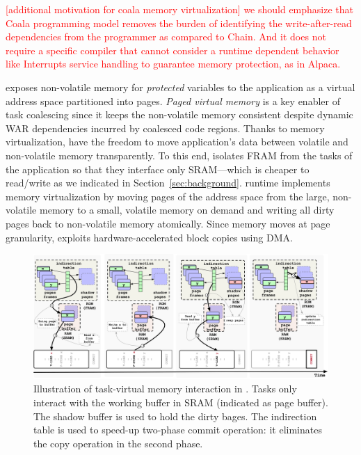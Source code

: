 \textcolor{red}{[additional motivation for coala memory virtualization] we should emphasize that Coala programming model removes the burden of identifying the write-after-read dependencies from the programmer  as compared to Chain. And it does not require a specific compiler that cannot consider a runtime dependent behavior like Interrupts service handling to guarantee memory protection, as in Alpaca.}

\sys exposes non-volatile memory for \emph{protected} variables to
the application as a virtual address space partitioned into pages.
\emph{Paged virtual memory} is a key enabler of task coalescing since it keeps the non-volatile memory consistent despite dynamic WAR dependencies incurred by coalesced code regions. Thanks to memory virtualization, \sys have the freedom to move application's data between volatile and non-volatile memory transparently.
%
%
To this end, \sys isolates FRAM from the tasks of the application so that they interface only SRAM---which is cheaper to read/write as we indicated in Section~\ref{sec:background}.
%
\sys runtime implements memory
virtualization by moving pages of the address space from the large,
non-volatile memory to a small, volatile memory on demand and writing all dirty
pages back to non-volatile memory atomically. Since memory moves at page granularity, \sys
exploits hardware\hyp{}accelerated block copies using DMA.


\begin{figure}
	\centering
	\includegraphics[width=\textwidth]{figures/graffle/paging.pdf}
	\caption{Illustration of task-virtual memory interaction in \sys. Tasks only interact with the working buffer in SRAM (indicated as page buffer). The shadow buffer is used to hold the dirty bages. The indirection table is used to speed-up two-phase commit operation: it eliminates the copy operation in the second phase.}
	\label{figure:coala_page_tags}
\end{figure}

